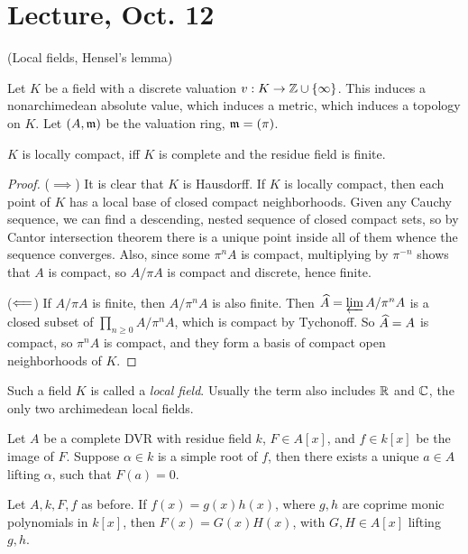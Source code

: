 \documentclass[11pt]{amsart}
\begin{document}
\section{Lecture, Oct. 12}

(Local fields, Hensel's lemma)

Let $K$ be a field with a discrete valuation $v: K\to \mathbb{Z}\cup\{\infty\}$. This induces a nonarchimedean absolute value, which induces a metric, which induces a topology on $K$. Let $(A,\mathfrak{m})$ be the valuation ring, $\mathfrak{m} = (\pi)$.

\begin{prop}
$K$ is locally compact, iff $K$ is complete and the residue field is finite.
\end{prop}

\begin{proof}
($\implies$) It is clear that $K$ is Hausdorff. If $K$ is locally compact, then each point of $K$ has a local base of closed compact neighborhoods. Given any Cauchy sequence, we can find a descending, nested sequence of closed compact sets, so by Cantor intersection theorem there is a unique point inside all of them whence the sequence converges. Also, since some $\pi^n A$ is compact, multiplying by $\pi^{-n}$ shows that $A$ is compact, so $A/\pi A$ is compact and discrete, hence finite.

($\Longleftarrow$) If $A/\pi A$ is finite, then $A/\pi^n A$ is also finite. Then $\widehat{A} = \varprojlim A/\pi^n A$ is a closed subset of $\prod_{n\ge 0}A/\pi^n A$, which is compact by Tychonoff. So $\widehat{A} = A$ is compact, so $\pi^n A$ is compact, and they form a basis of compact open neighborhoods of $K$.
\end{proof}

Such a field $K$ is called a \emph{local field}. Usually the term also includes $\mathbb{R}$ and $\mathbb{C}$, the only two archimedean local fields. 

\begin{lem}
Let $A$ be a complete DVR with residue field $k$, $F\in A[x]$, and $f \in k[x]$ be the image of $F$. Suppose $\alpha\in k$ is a simple root of $f$, then there exists a unique $a\in A$ lifting $\alpha$, such that $F(a) = 0$.
\end{lem}

\begin{lem}
Let $A,k,F,f$ as before. If $f(x) = g(x)h(x)$, where $g,h$ are coprime monic polynomials in $k[x]$, then $F(x) = G(x)H(x)$, with $G,H\in A[x]$ lifting $g,h$.
\end{lem}
\end{document}
